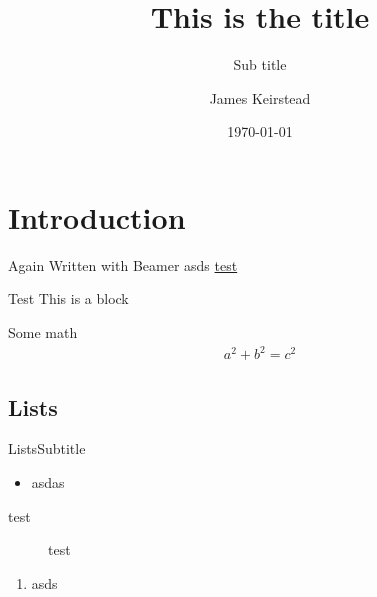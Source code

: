 
\title{This is the title}
\subtitle{Sub title}
\date{\today}
\author{James Keirstead}

\usepackage{lipsum}
\usepackage{amsmath}


\begin{frame}
\maketitle
\end{frame}

\section{Introduction}

\lipsum[1]

\begin{frame}{Again}
Written with Beamer \citep{Tantau_2004} \pause
asds \url{test}

\begin{block}{Test}
This is a block
\end{block}

Some math
\begin{align*}
a^2 + b^2 = c^2
\end{align*}
\end{frame}

\lipsum[2]

\subsection{Lists}

\begin{frame}{Lists}{Subtitle}
\begin{itemize}
\item asdas
\end{itemize}

\begin{description}
\item [test] test
\end{description}

\begin{enumerate}
\item asds
\end{enumerate}
\end{frame}



